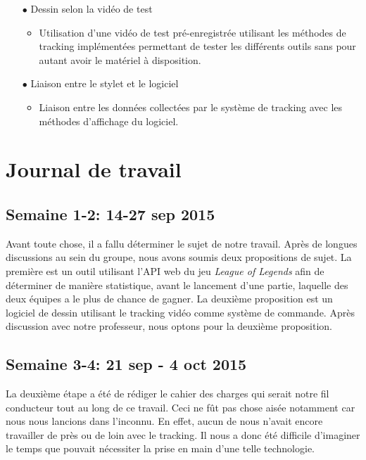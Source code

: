 \documentclass[11pt,a4paper,oldfontcommands]{memoir}
\begin{document}
\begin{itemize}
\begin{itemize}
	\end{itemize}
\item[$\bullet$] Dessin selon la vidéo de test
    \begin{itemize}
	\item Utilisation d’une vidéo de test pré-enregistrée utilisant les méthodes de tracking implémentées permettant de tester les différents outils sans pour autant avoir le matériel à disposition.
	\end{itemize}
\item[$\bullet$] Liaison entre le stylet et le logiciel
    \begin{itemize}
	\item Liaison entre les données collectées par le système de tracking avec les méthodes d’affichage du logiciel.
	\end{itemize}
\end{itemize}


\chapter{Journal de travail}

\section{Semaine 1-2: 14-27 sep 2015}

Avant toute chose, il a fallu déterminer le sujet de notre travail. Après de longues discussions au sein du groupe, nous avons soumis deux propositions de sujet. La première est un outil utilisant l'API web du jeu \textit{League of Legends} afin de déterminer de manière statistique, avant le lancement d'une partie, laquelle des deux équipes a le plus de chance de gagner. La deuxième proposition est un logiciel de dessin utilisant le tracking vidéo comme système de commande. Après discussion avec notre professeur, nous optons pour la deuxième proposition.

\section{Semaine 3-4: 21 sep - 4 oct 2015}

La deuxième étape a été de rédiger le cahier des charges qui serait notre fil conducteur tout au long de ce travail. Ceci ne fût pas chose aisée notamment car nous nous lancions dans l'inconnu. En effet, aucun de nous n'avait encore travailler de près ou de loin avec le tracking. Il nous a donc été difficile d'imaginer le temps que pouvait nécessiter la prise en main d'une telle technologie.
\end{document}
